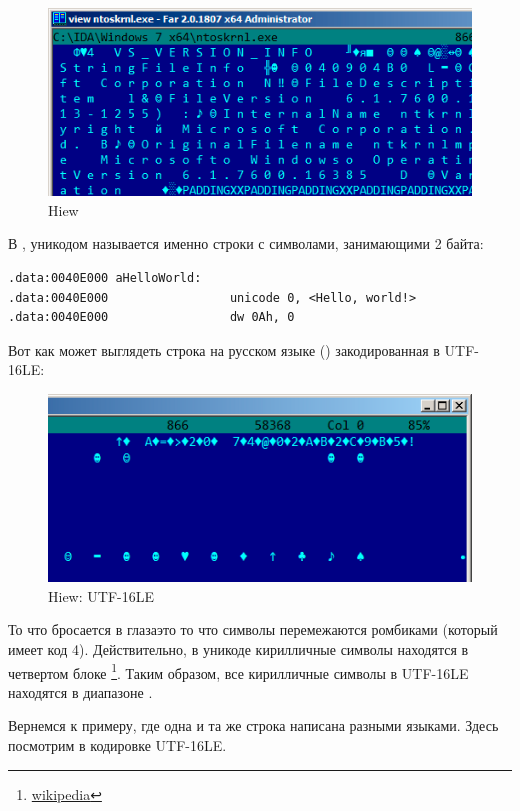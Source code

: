 \begin{figure}[H]
\centering
\includegraphics[scale=\NormalScale]{digging_into_code/strings/ntoskrnl_UTF16.png}
\caption{Hiew}
\end{figure}

В \IDA, уникодом называется именно строки с символами, занимающими 2 байта:

\begin{lstlisting}
.data:0040E000 aHelloWorld:
.data:0040E000                 unicode 0, <Hello, world!>
.data:0040E000                 dw 0Ah, 0
\end{lstlisting}

Вот как может выглядеть строка на русском языке () закодированная в UTF-16LE:

\begin{figure}[H]
\centering
\includegraphics[scale=\NormalScale]{digging_into_code/strings/russian_UTF16.png}
\caption{Hiew: UTF-16LE}
\end{figure}

То что бросается в глаза\EMDASH{}это то что символы перемежаются ромбиками (который имеет код 4).
Действительно, в уникоде кирилличные символы находятся в четвертом блоке
\footnote{\href{http://go.yurichev.com/17003}{wikipedia}}.
Таким образом, все кирилличные символы в UTF-16LE находятся в диапазоне .

Вернемся к примеру, где одна и та же строка написана разными языками.
Здесь посмотрим в кодировке UTF-16LE.


